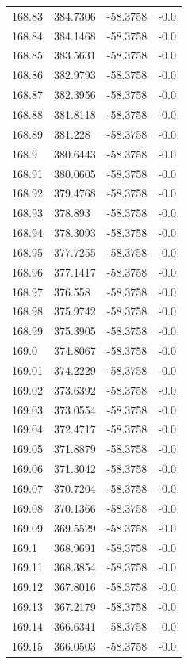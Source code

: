 \begin{table}[H]
\begin{tabular}{llll}
168.83 & 384.7306 & -58.3758 & -0.0 \\
168.84 & 384.1468 & -58.3758 & -0.0 \\
168.85 & 383.5631 & -58.3758 & -0.0 \\
168.86 & 382.9793 & -58.3758 & -0.0 \\
168.87 & 382.3956 & -58.3758 & -0.0 \\
168.88 & 381.8118 & -58.3758 & -0.0 \\
168.89 & 381.228 & -58.3758 & -0.0 \\
168.9 & 380.6443 & -58.3758 & -0.0 \\
168.91 & 380.0605 & -58.3758 & -0.0 \\
168.92 & 379.4768 & -58.3758 & -0.0 \\
168.93 & 378.893 & -58.3758 & -0.0 \\
168.94 & 378.3093 & -58.3758 & -0.0 \\
168.95 & 377.7255 & -58.3758 & -0.0 \\
168.96 & 377.1417 & -58.3758 & -0.0 \\
168.97 & 376.558 & -58.3758 & -0.0 \\
168.98 & 375.9742 & -58.3758 & -0.0 \\
168.99 & 375.3905 & -58.3758 & -0.0 \\
169.0 & 374.8067 & -58.3758 & -0.0 \\
169.01 & 374.2229 & -58.3758 & -0.0 \\
169.02 & 373.6392 & -58.3758 & -0.0 \\
169.03 & 373.0554 & -58.3758 & -0.0 \\
169.04 & 372.4717 & -58.3758 & -0.0 \\
169.05 & 371.8879 & -58.3758 & -0.0 \\
169.06 & 371.3042 & -58.3758 & -0.0 \\
169.07 & 370.7204 & -58.3758 & -0.0 \\
169.08 & 370.1366 & -58.3758 & -0.0 \\
169.09 & 369.5529 & -58.3758 & -0.0 \\
169.1 & 368.9691 & -58.3758 & -0.0 \\
169.11 & 368.3854 & -58.3758 & -0.0 \\
169.12 & 367.8016 & -58.3758 & -0.0 \\
169.13 & 367.2179 & -58.3758 & -0.0 \\
169.14 & 366.6341 & -58.3758 & -0.0 \\
169.15 & 366.0503 & -58.3758 & -0.0 \\

\end{tabular}
\end{table}
